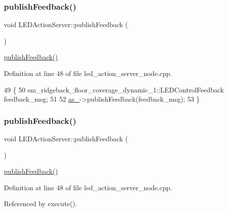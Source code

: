 \subsubsection{\texorpdfstring{publish\+Feedback()}{publishFeedback()}\hspace{0.1cm}{\footnotesize\ttfamily [1/4]}}
{\footnotesize\ttfamily void L\+E\+D\+Action\+Server\+::publish\+Feedback (\begin{DoxyParamCaption}{ }\end{DoxyParamCaption})\hspace{0.3cm}{\ttfamily [inline]}}

\hyperlink{classLEDActionServer_a25c93d4e7ecdacbb4f5b090d7789aa36}{publish\+Feedback()} 

Definition at line 48 of file led\+\_\+action\+\_\+server\+\_\+node.\+cpp.


\begin{DoxyCode}
49 \{
50     sm\_ridgeback\_floor\_coverage\_dynamic\_1::LEDControlFeedback feedback\_msg;
51     
52     \hyperlink{classLEDActionServer_a61d21c77642081acf017d4ebd65b2de0}{as\_}->publishFeedback(feedback\_msg);
53 \}
\end{DoxyCode}
\mbox{\label{classLEDActionServer_a25c93d4e7ecdacbb4f5b090d7789aa36}} 
\subsubsection{\texorpdfstring{publish\+Feedback()}{publishFeedback()}\hspace{0.1cm}{\footnotesize\ttfamily [2/4]}}
{\footnotesize\ttfamily void L\+E\+D\+Action\+Server\+::publish\+Feedback (\begin{DoxyParamCaption}{ }\end{DoxyParamCaption})\hspace{0.3cm}{\ttfamily [inline]}}

\hyperlink{classLEDActionServer_a25c93d4e7ecdacbb4f5b090d7789aa36}{publish\+Feedback()} 

Definition at line 48 of file led\+\_\+action\+\_\+server\+\_\+node.\+cpp.



Referenced by execute().


